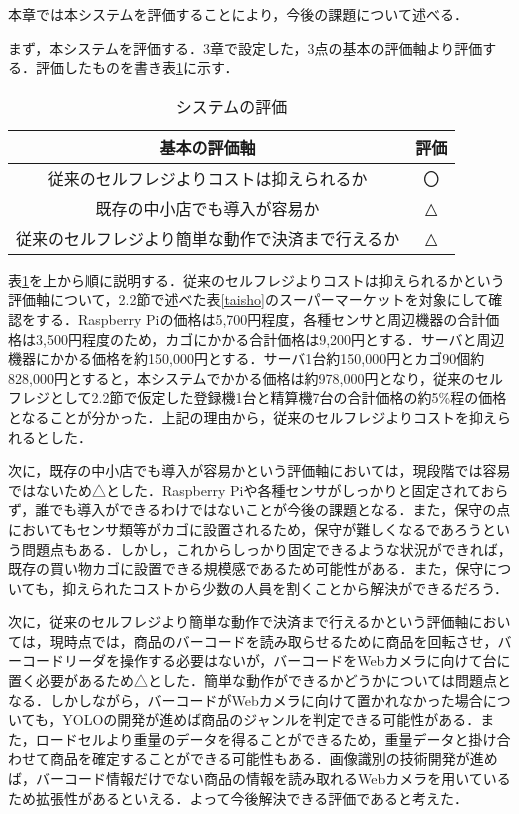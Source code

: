 
本章では本システムを評価することにより，今後の課題について述べる．

まず，本システムを評価する．3章で設定した，3点の基本の評価軸より評価する．評価したものを書き表\ref{hyouka}に示す．

\begin{table}[htb]
\begin{center}
\caption{システムの評価}
\begin{tabular}{|c|c|} \hline
基本の評価軸 & 評価 \\ \hline \hline
従来のセルフレジよりコストは抑えられるか & 〇 \\
既存の中小店でも導入が容易か & △ \\
従来のセルフレジより簡単な動作で決済まで行えるか & △\\ \hline
\end{tabular}
\label{hyouka}
\end{center}
\end{table}

表\ref{hyouka}を上から順に説明する．従来のセルフレジよりコストは抑えられるかという評価軸について，2.2節で述べた表\ref{taisho}のスーパーマーケットを対象にして確認をする．Raspberry Piの価格は5,700円程度，各種センサと周辺機器の合計価格は3,500円程度のため，カゴにかかる合計価格は9,200円とする．サーバと周辺機器にかかる価格を約150,000円とする．サーバ1台約150,000円とカゴ90個約828,000円とすると，本システムでかかる価格は約978,000円となり，従来のセルフレジとして2.2節で仮定した登録機1台と精算機7台の合計価格の約5\%程の価格となることが分かった．上記の理由から，従来のセルフレジよりコストを抑えられるとした．

次に，既存の中小店でも導入が容易かという評価軸においては，現段階では容易ではないため△とした．Raspberry Piや各種センサがしっかりと固定されておらず，誰でも導入ができるわけではないことが今後の課題となる．また，保守の点においてもセンサ類等がカゴに設置されるため，保守が難しくなるであろうという問題点もある．しかし，これからしっかり固定できるような状況ができれば，既存の買い物カゴに設置できる規模感であるため可能性がある．また，保守についても，抑えられたコストから少数の人員を割くことから解決ができるだろう．

次に，従来のセルフレジより簡単な動作で決済まで行えるかという評価軸においては，現時点では，商品のバーコードを読み取らせるために商品を回転させ，バーコードリーダを操作する必要はないが，バーコードをWebカメラに向けて台に置く必要があるため△とした．簡単な動作ができるかどうかについては問題点となる．しかしながら，バーコードがWebカメラに向けて置かれなかった場合についても，YOLOの開発が進めば商品のジャンルを判定できる可能性がある．また，ロードセルより重量のデータを得ることができるため，重量データと掛け合わせて商品を確定することができる可能性もある．画像識別の技術開発が進めば，バーコード情報だけでない商品の情報を読み取れるWebカメラを用いているため拡張性があるといえる．よって今後解決できる評価であると考えた．

